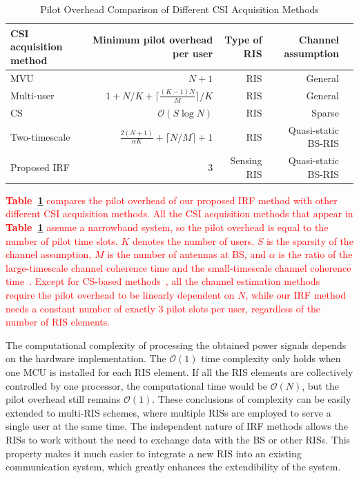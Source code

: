 \documentclass[journal,twocolumn]{IEEEtran}
\theoremstyle{nonumberplain}
\newcommand{\red}[1]{\textcolor{red}{#1}}
\begin{document}
    \begin{table}[t]
        \caption{Pilot Overhead Comparison of Different CSI Acquisition Methods}
        \label{tab:pilot overhead comp CE}
        \centering
        \begin{tabular}{|l|r|r|r|r|}
            \hline 
            CSI acquisition method & Minimum pilot overhead per user & Type of RIS& Channel assumption\\ 
            \hline
            MVU\cite{jensen2020optimal}     & $N+1$    &RIS& General  \\
            \hline
            Multi-user\cite{wang2020channel}& $1+N/K+ \lceil \frac{(K-1)N}{M} \rceil/K$ &RIS& General  \\
            \hline
            CS\cite{wei2021channel}         & $\mathcal{O}(S\log N)$ &RIS& Sparse \\
            \hline 
            Two-timescale\cite{Huchen} & $\frac{2(N+1)}{\alpha K}+\lceil N/M\rceil+1$ &RIS& Quasi-static BS-RIS  \\
            \hline 
            Proposed IRF & $3$ & Sensing RIS  & Quasi-static BS-RIS\\ 
            \hline
        \end{tabular}
    \end{table}

    \red{
    {\bf Table~\ref{tab:pilot overhead comp CE}} compares the pilot overhead of our proposed IRF method with other different CSI acquisition methods. 
    All the CSI acquisition methods that appear in {\bf Table~\ref{tab:pilot overhead comp CE}} assume a narrowband system, so the pilot overhead is equal to the number of pilot time slots.
    $K$ denotes the number of users, $S$ is the sparsity of the channel assumption, $M$ is the number of antennas at BS, and $\alpha$ is the ratio of the large-timescale channel  coherence time and the small-timescale channel coherence time~\cite{Huchen}. 
    Except for CS-based methods~\cite{wei2021channel}, all the channel estimation methods~\cite{jensen2020optimal,wang2020channel,Huchen} require the pilot overhead to be linearly dependent on $N$, while our IRF method needs a constant number of exactly 3 pilot slots per user, regardless of the number of RIS elements. 
    }

    The computational complexity of processing the obtained power signals depends on the hardware implementation. 
    The $\mathcal{O}(1)$ time complexity only holds when one MCU is installed for each RIS element. 
    If all the RIS elements are collectively controlled by one processor, the computational time would be $\mathcal{O}(N)$, but the pilot overhead still remains $\mathcal{O}(1)$. 
    These conclusions of complexity can be easily extended to multi-RIS schemes, where multiple RISs are employed to serve a single user at the same time. 
    The independent nature of IRF methods allows the RISs to work without the need to exchange data with the BS or other RISs. 
    This property makes it much easier to integrate a new RIS into an existing communication system, which greatly enhances the extendibility of the system.
    
\end{document}
